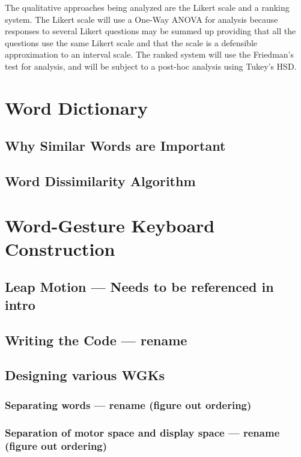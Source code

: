 The qualitative approaches being analyzed are the Likert scale and a ranking system. The Likert scale will use a One-Way ANOVA for analysis because responses to several Likert questions may be summed up providing that all the questions use the same Likert scale and that the scale is a defensible approximation to an interval scale. The ranked system will use the Friedman's test for analysis, and will be subject to a post-hoc analysis using Tukey's HSD.


\section{Word Dictionary}

\subsection{Why Similar Words are Important}

\subsection {Word Dissimilarity Algorithm}

\section{Word-Gesture Keyboard Construction}

\subsection{Leap Motion --- Needs to be referenced in intro}

\subsection{Writing the Code --- rename}

\subsection{Designing various WGKs}

\subsubsection{Separating words --- rename (figure out ordering)}

\subsubsection{Separation of motor space and display space --- rename (figure out ordering)}

